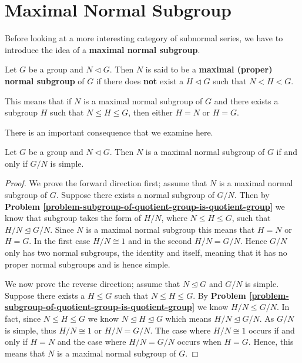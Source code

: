 \section{Maximal Normal Subgroup}
Before looking at a more interesting category of subnormal series, we have to introduce the idea of a \textbf{maximal normal subgroup}.
\begin{definition}
    Let $G$ be a group and $N \lhd G$. Then $N$ is said to be a \textbf{maximal (proper) normal subgroup} of $G$ if there does \textbf{not} exist a $H \lhd G$ such that $N < H < G$.
\end{definition}
\begin{remark}
    This means that if $N$ is a maximal normal subgroup of $G$ and there exists a subgroup $H$ such that $N \leq H \leq G$, then either $H = N$ or $H = G$.
\end{remark}

There is an important consequence that we examine here.
\begin{theorem}\label{thrm-maximal-normal-subgroup-iff-quotient-is-simple}
    Let $G$ be a group and $N \lhd G$. Then $N$ is a maximal normal subgroup of $G$ if and only if $G/N$ is simple.
\end{theorem}

\begin{proof}
    We prove the forward direction first; assume that $N$ is a maximal normal subgroup of $G$. Suppose there exists a normal subgroup of $G/N$. Then by \textbf{Problem \ref{problem-subgroup-of-quotient-group-is-quotient-group}} we know that subgroup takes the form of $H/N$, where $N \leq H \leq G$, such that $H/N \unlhd G/N$. Since $N$ is a maximal normal subgroup this means that $H = N$ or $H = G$. In the first case $H/N \cong 1$ and in the second $H / N = G/N$. Hence $G/N$ only has two normal subgroups, the identity and itself, meaning that it has no proper normal subgroups and is hence simple.
    
    We now prove the reverse direction; assume that $N \unlhd G$ and $G/N$ is simple. Suppose there exists a $H \leq G$ such that $N \leq H \leq G$. By \textbf{Problem \ref{problem-subgroup-of-quotient-group-is-quotient-group}} we know $H/N \leq G/N$. In fact, since $N \leq H \leq G$ we know $N \unlhd H \unlhd G$ which means $H/N \unlhd G/N$. As $G/N$ is simple, thus $H/N \cong 1$ or $H/N = G/N$. The case where $H/N \cong 1$ occurs if and only if $H = N$ and the case where $H/N = G/N$ occurs when $H = G$. Hence, this means that $N$ is a maximal normal subgroup of $G$.
\end{proof}


